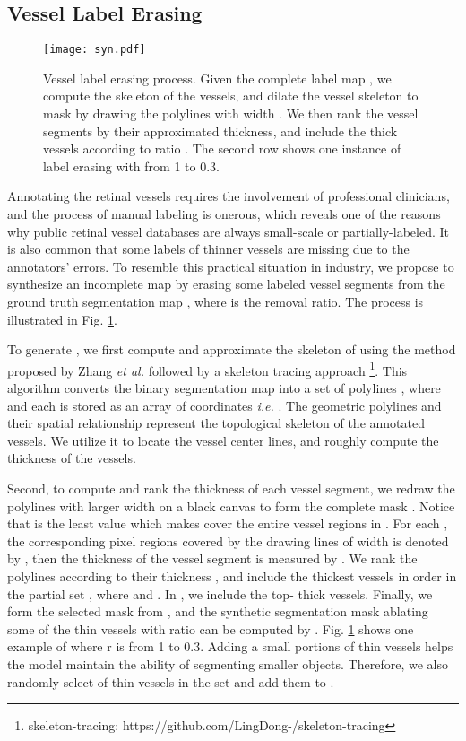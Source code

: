 \documentclass[runningheads]{llncs}
\newcommand{\etal}{\textit{et al.}}
\begin{document}
\subsection{Vessel Label Erasing}
\begin{figure}[t]\centering
\texttt{[image: syn.pdf]}
\caption{Vessel label erasing process. Given the complete label map , we compute the skeleton of the vessels, and dilate the vessel skeleton to mask by drawing the polylines with width . We then rank the vessel segments by their approximated thickness, and include the thick vessels according to ratio . The second row shows one instance of label erasing with  from 1 to 0.3.}
\label{fig:synp}
\end{figure}
Annotating the retinal vessels requires the involvement of professional clinicians, and the process of manual labeling is onerous, which reveals one of the reasons why public retinal vessel databases are always small-scale or partially-labeled. It is also common that some labels of thinner vessels are missing due to the annotators' errors. To resemble this practical situation in industry, we propose to synthesize an incomplete map  by erasing some labeled vessel segments  from the ground truth segmentation map , where  is the removal ratio. The process is illustrated in Fig. \ref{fig:synp}.

To generate , we first compute and approximate the skeleton of  using the method proposed by Zhang \etal \cite{zhang1984fast} followed by a skeleton tracing approach \footnote{skeleton-tracing: https://github.com/LingDong-/skeleton-tracing}. This algorithm converts the binary segmentation map into a set of polylines , where  and each  is stored as an array of coordinates \textit{i.e.} . The geometric polylines and their spatial relationship represent the topological skeleton of the annotated vessels. We utilize it to locate the vessel center lines, and roughly compute the thickness of the vessels. 

Second, to compute and rank the thickness of each vessel segment, we redraw the polylines with larger width  on a black canvas to form the complete mask . Notice that  is the least value which makes  cover the entire vessel regions in . For each , the corresponding pixel regions covered by the drawing lines of width  is denoted by , then the thickness  of the vessel segment is measured by . We rank the polylines according to their thickness , and include the thickest vessels in order in the partial set , where  and . In , we include the top- thick vessels. Finally, we form the selected mask  from , and the synthetic segmentation mask ablating some of the thin vessels with ratio  can be computed by . Fig. \ref{fig:synp} shows one example of  where r is from 1 to 0.3. Adding a small portions of thin vessels helps the model maintain the ability of segmenting smaller objects. Therefore, we also randomly select  of thin vessels in the set and add them to . 
\end{document}
